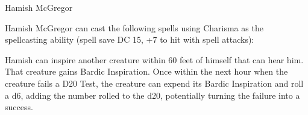 \begin{DndMonster}[width=0.5\textwidth]{Hamish McGregor}
	\begin{DndMonsterSpells}
		\item[Spellcasting] Hamish McGregor can cast the following spells using Charisma as the spellcasting ability (spell save DC 15, +7 to hit with spell attacks):
	\end{DndMonsterSpells}
	
	Hamish can inspire another creature within 60 feet of himself that can hear him. That creature gains Bardic Inspiration. Once within the next hour when the creature fails a D20 Test, the creature can expend its Bardic Inspiration and roll a d6, adding the number rolled to the d20, potentially turning the failure into a success.
\end{DndMonster}